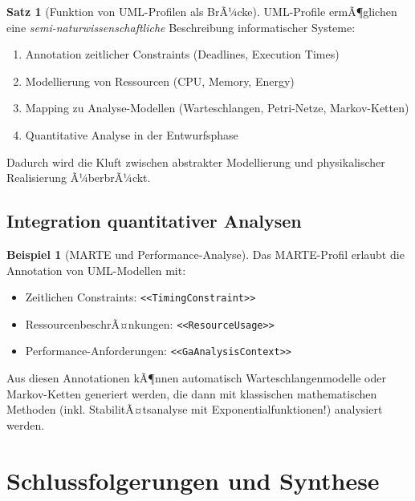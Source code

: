 ﻿\documentclass[a4paper,12pt]{report}
\theoremstyle{definition}
\newtheorem{beispiel}{Beispiel}[section]
\newtheorem{satz}{Satz}[section]
\begin{document}
\begin{satz}[Funktion von UML-Profilen als BrÃ¼cke]
	UML-Profile ermÃ¶glichen eine \textit{semi-naturwissenschaftliche} Beschreibung informatischer Systeme:
	\begin{enumerate}
		\item[-] Annotation zeitlicher Constraints (Deadlines, Execution Times)
		\item[-] Modellierung von Ressourcen (CPU, Memory, Energy)
		\item[-] Mapping zu Analyse-Modellen (Warteschlangen, Petri-Netze, Markov-Ketten)
		\item[-] Quantitative Analyse in der Entwurfsphase
	\end{enumerate}
	
	Dadurch wird die Kluft zwischen abstrakter Modellierung und physikalischer Realisierung Ã¼berbrÃ¼ckt.
\end{satz}

\subsection{Integration quantitativer Analysen}

\begin{beispiel}[MARTE und Performance-Analyse]
	Das MARTE-Profil erlaubt die Annotation von UML-Modellen mit:
	\begin{itemize}
		\item[-] Zeitlichen Constraints: \texttt{<<TimingConstraint>>}
		\item[-] RessourcenbeschrÃ¤nkungen: \texttt{<<ResourceUsage>>}
		\item[-] Performance-Anforderungen: \texttt{<<GaAnalysisContext>>}
	\end{itemize}
	
	Aus diesen Annotationen kÃ¶nnen automatisch Warteschlangenmodelle oder Markov-Ketten generiert werden, die dann mit klassischen mathematischen Methoden (inkl. StabilitÃ¤tsanalyse mit Exponentialfunktionen!) analysiert werden.
\end{beispiel}

\section{Schlussfolgerungen und Synthese}
\end{document}
